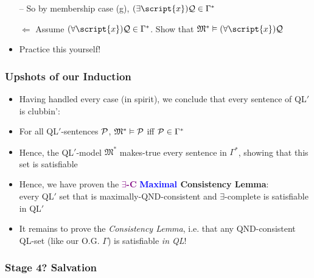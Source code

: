 \begin{frame}
\begin{itemize}[<+->]
\item[] -- So by membership case (g), $\qt{\exists}{\script{x}} \metav{Q} \in \Gamma^{\ast}$ 

\fi

\item[$\Leftarrow$] Assume $\qt{\forall}{\script{x}} \metav{Q} \in \Gamma^{\ast}$. Show that $\mathfrak{M}^{\ast} \entails \qt{\forall}{\script{x}} \metav{Q}$

\bi
\item Practice this yourself! 
\ei


\end{itemize}
\end{frame}

\begin{frame}
\frametitle{Upshots of our Induction}

\begin{itemize}[<+->]

\item Having handled every case (in spirit), we conclude that every sentence of QL$'$ is clubbin': 

\item For all QL$'$-sentences $\mathcal{P}$, $\mathfrak{M}^{\ast} \vDash \mathcal{P}$ iff $\mathcal{P} \in \Gamma^{\ast}$ 

\item Hence, the QL$'$-model $\mathfrak{M}^{\ast}$ makes-true every sentence in  $\Gamma^{\ast}$, showing that this set is satisfiable

\item Hence, we have proven the \textbf{\textcolor{purple}{$\exists$-C}} \textbf{\textcolor{blue}{Maximal} \alert{Consistency Lemma}}: \\ every QL$'$ set that is maximally-QND-consistent and $\exists$-complete is satisfiable in QL\emph{$'$}

\item It remains to prove the \emph{Consistency Lemma}, i.e. that any QND-consistent QL-set (like our O.G. $\Gamma$) is satisfiable \emph{in QL}!

\end{itemize}
\end{frame}

\subsubsection{Stage 4? Salvation}

